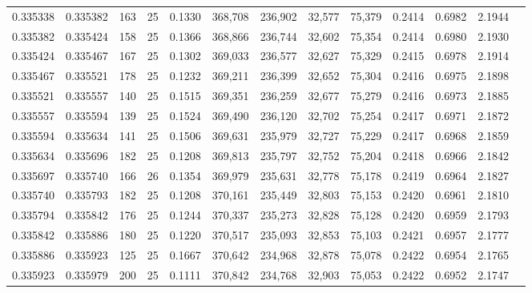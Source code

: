 \begin{tabular}{rrrrrrrrrrrrr}
0.335338 & 0.335382 &   163 &  25 &                                     0.1330 & 368,708 & 236,902 &  32,577 &  75,379 & 0.2414 & 0.6982 & 2.1944 \\
0.335382 & 0.335424 &   158 &  25 &                                     0.1366 & 368,866 & 236,744 &  32,602 &  75,354 & 0.2414 & 0.6980 & 2.1930 \\
0.335424 & 0.335467 &   167 &  25 &                                     0.1302 & 369,033 & 236,577 &  32,627 &  75,329 & 0.2415 & 0.6978 & 2.1914 \\
0.335467 & 0.335521 &   178 &  25 &                                     0.1232 & 369,211 & 236,399 &  32,652 &  75,304 & 0.2416 & 0.6975 & 2.1898 \\
0.335521 & 0.335557 &   140 &  25 &                                     0.1515 & 369,351 & 236,259 &  32,677 &  75,279 & 0.2416 & 0.6973 & 2.1885 \\
0.335557 & 0.335594 &   139 &  25 &                                     0.1524 & 369,490 & 236,120 &  32,702 &  75,254 & 0.2417 & 0.6971 & 2.1872 \\
0.335594 & 0.335634 &   141 &  25 &                                     0.1506 & 369,631 & 235,979 &  32,727 &  75,229 & 0.2417 & 0.6968 & 2.1859 \\
0.335634 & 0.335696 &   182 &  25 &                                     0.1208 & 369,813 & 235,797 &  32,752 &  75,204 & 0.2418 & 0.6966 & 2.1842 \\
0.335697 & 0.335740 &   166 &  26 &                                     0.1354 & 369,979 & 235,631 &  32,778 &  75,178 & 0.2419 & 0.6964 & 2.1827 \\
0.335740 & 0.335793 &   182 &  25 &                                     0.1208 & 370,161 & 235,449 &  32,803 &  75,153 & 0.2420 & 0.6961 & 2.1810 \\
0.335794 & 0.335842 &   176 &  25 &                                     0.1244 & 370,337 & 235,273 &  32,828 &  75,128 & 0.2420 & 0.6959 & 2.1793 \\
0.335842 & 0.335886 &   180 &  25 &                                     0.1220 & 370,517 & 235,093 &  32,853 &  75,103 & 0.2421 & 0.6957 & 2.1777 \\
0.335886 & 0.335923 &   125 &  25 &                                     0.1667 & 370,642 & 234,968 &  32,878 &  75,078 & 0.2422 & 0.6954 & 2.1765 \\
0.335923 & 0.335979 &   200 &  25 &                                     0.1111 & 370,842 & 234,768 &  32,903 &  75,053 & 0.2422 & 0.6952 & 2.1747 \\

\end{tabular}
